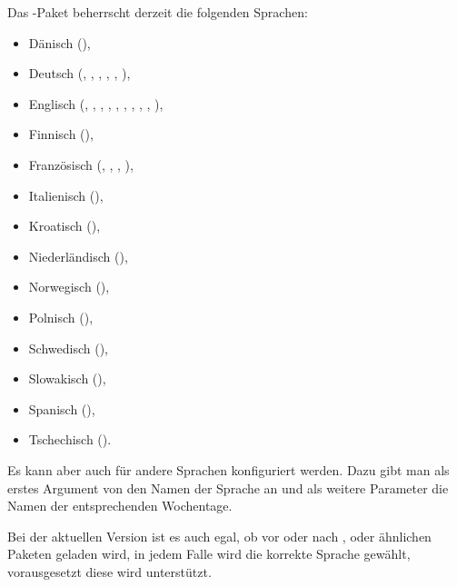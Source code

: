 \begin{Declaration}
\end{Declaration}
Das -Paket beherrscht derzeit die folgenden Sprachen:
\begin{itemize}\raggedright\setlength{\itemsep}{.5\itemsep}
\item Dänisch (),
\item Deutsch (,
  , , , ,
  ),
\item Englisch (,
  , , , ,
  , , ,
  , ),
\item Finnisch (),
\item Französisch (, ,
  , ),
\item Italienisch (),
\item Kroatisch (),
\item Niederländisch (),
\item Norwegisch (),
\item Polnisch (),
\item Schwedisch (),
\item Slowakisch (),
\item Spanisch (),
\item Tschechisch ().
\end{itemize}
Es kann aber auch für andere Sprachen konfiguriert werden. Dazu gibt man als
erstes Argument von  den Namen der Sprache an und als
weitere Parameter die Namen der entsprechenden Wochentage.

Bei der aktuellen Version ist es auch egal, ob  vor oder nach
, 
oder ähnlichen Paketen geladen wird, in jedem Falle wird die korrekte Sprache
gewählt, vorausgesetzt diese wird unterstützt.

